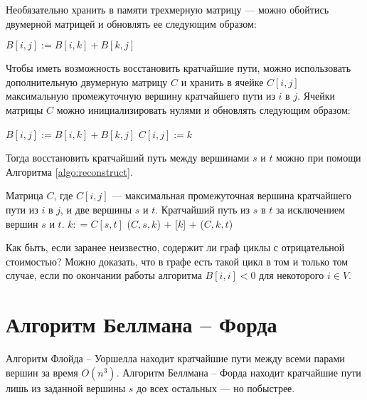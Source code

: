 \documentclass[a4paper,12pt]{article}
\begin{document}
Необязательно хранить в памяти трехмерную матрицу --- можно обойтись двумерной матрицей и обновлять ее следующим образом:
\begin{center}
	\begin{algorithmic}%
						\State $B[i, j] := B[i, k] + B[k, j]$
					\EndIf
	\end{algorithmic}
\end{center}
Чтобы иметь возможность восстановить кратчайшие пути, можно использовать дополнительную двумерную матрицу $C$ и хранить в ячейке $C[i, j]$ максимальную промежуточную вершину кратчайшего пути из $i$ в $j$. Ячейки матрицы $C$ можно инициализировать нулями и обновлять следующим образом:
\begin{center}
	\begin{algorithmic}%
						\State $B[i, j] := B[i, k] + B[k, j]$
						\State $C[i, j] := k$
					\EndIf
	\end{algorithmic}
\end{center}
Тогда восстановить кратчайший путь между вершинами $s$ и $t$ можно при помощи Алгоритма \ref{algo:reconstruct}.
\begin{algorithm}
  	\caption{($C, s, t$)}
	\label{algo:reconstruct}
	\begin{algorithmic}%
		\Require Матрица $C$, где $C[i, j]$ --- максимальная промежуточная вершина кратчайшего пути из $i$ в $j$, и две вершины $s$ и $t$.
		\Ensure Кратчайший путь из $s$ в $t$ за исключением вершин $s$ и $t$.
		\State
		\State $k: = C[s, t]$
			\Return []
		\EndIf
		\Return {}($C, s, k$) + [$k$] + ($C, k, t$)
	\end{algorithmic}
\end{algorithm}

Как быть, если заранее неизвестно, содержит ли граф циклы с отрицательной стоимостью? Можно доказать, что в графе есть такой цикл в том и только том случае, если по окончании работы алгоритма $B[i, i] < 0$ для некоторого $i \in V$.
\newpage
\section{Алгоритм Беллмана -- Форда}
Алгоритм Флойда -- Уоршелла находит кратчайшие пути между всеми парами вершин за время $O(n^3)$. Алгоритм Беллмана -- Форда находит кратчайшие пути лишь из заданной вершины $s$ до всех остальных --- но побыстрее.
\end{document}
